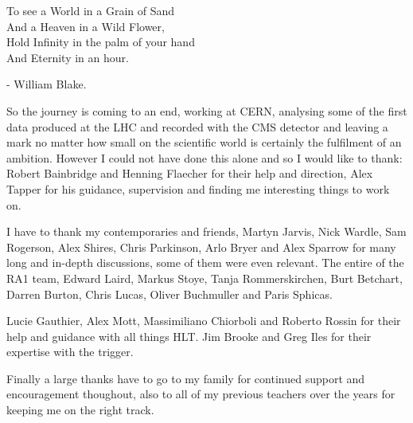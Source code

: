\begin{preface}
\begin{centering}To see a World in a Grain of Sand\\
And a Heaven in a Wild Flower,\\
Hold Infinity in the palm of your hand \\
And Eternity in an hour.\\
\end{centering}

\begin{flushright}
- William Blake.
\end{flushright}
\end{preface}

\begin{acknowledgements}
So the journey is coming to an end, working at CERN, analysing some of the 
first data produced at the LHC and recorded with the CMS detector and leaving 
a mark no matter how small on the scientific world is certainly the fulfilment 
of an ambition. However I could not have done this alone and so I would like to 
thank: Robert Bainbridge and Henning Flaecher for their help and direction, 
Alex Tapper for his guidance, supervision and finding me interesting things to 
work on.

I have to thank my contemporaries and friends, Martyn Jarvis, Nick Wardle, Sam 
Rogerson, Alex Shires, Chris Parkinson, Arlo Bryer and Alex Sparrow for many 
long and in-depth discussions, some of them were even relevant. The entire of 
the RA1 team, Edward Laird, Markus Stoye, Tanja Rommerskirchen, Burt Betchart, 
Darren Burton, Chris Lucas, Oliver Buchmuller and Paris Sphicas.

Lucie Gauthier, Alex Mott, Massimiliano Chiorboli and Roberto Rossin for their 
help and guidance with all things HLT. Jim Brooke and Greg Iles for their 
expertise with the \Lone trigger.

Finally a large thanks have to go to my family for continued support and 
encouragement thoughout, also to all of my previous teachers over the years 
for keeping me on the right track.

\end{acknowledgements}


